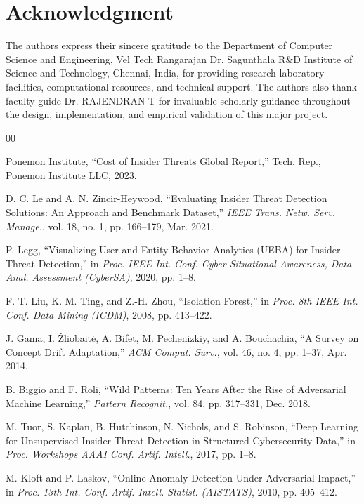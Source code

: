 \documentclass[conference]{IEEEtran}
\begin{document}
\section*{Acknowledgment}
The authors express their sincere gratitude to the Department of Computer Science and Engineering, Vel Tech Rangarajan Dr. Sagunthala R\&D Institute of Science and Technology, Chennai, India, for providing research laboratory facilities, computational resources, and technical support. The authors also thank faculty guide Dr. RAJENDRAN T for invaluable scholarly guidance throughout the design, implementation, and empirical validation of this major project.

\begin{thebibliography}{00}

 Ponemon Institute, ``Cost of Insider Threats Global Report,'' Tech. Rep., Ponemon Institute LLC, 2023.

 D. C. Le and A. N. Zincir-Heywood, ``Evaluating Insider Threat Detection Solutions: An Approach and Benchmark Dataset,'' \textit{IEEE Trans. Netw. Serv. Manage.}, vol. 18, no. 1, pp. 166--179, Mar. 2021.

 P. Legg, ``Visualizing User and Entity Behavior Analytics (UEBA) for Insider Threat Detection,'' in \textit{Proc. IEEE Int. Conf. Cyber Situational Awareness, Data Anal. Assessment (CyberSA)}, 2020, pp. 1--8.

 F. T. Liu, K. M. Ting, and Z.-H. Zhou, ``Isolation Forest,'' in \textit{Proc. 8th IEEE Int. Conf. Data Mining (ICDM)}, 2008, pp. 413--422.

 J. Gama, I. \v{Z}liobait\.{e}, A. Bifet, M. Pechenizkiy, and A. Bouchachia, ``A Survey on Concept Drift Adaptation,'' \textit{ACM Comput. Surv.}, vol. 46, no. 4, pp. 1--37, Apr. 2014.

 B. Biggio and F. Roli, ``Wild Patterns: Ten Years After the Rise of Adversarial Machine Learning,'' \textit{Pattern Recognit.}, vol. 84, pp. 317--331, Dec. 2018.

 M. Tuor, S. Kaplan, B. Hutchinson, N. Nichols, and S. Robinson, ``Deep Learning for Unsupervised Insider Threat Detection in Structured Cybersecurity Data,'' in \textit{Proc. Workshops AAAI Conf. Artif. Intell.}, 2017, pp. 1--8.

 M. Kloft and P. Laskov, ``Online Anomaly Detection Under Adversarial Impact,'' in \textit{Proc. 13th Int. Conf. Artif. Intell. Statist. (AISTATS)}, 2010, pp. 405--412.


\end{thebibliography}
\end{document}
